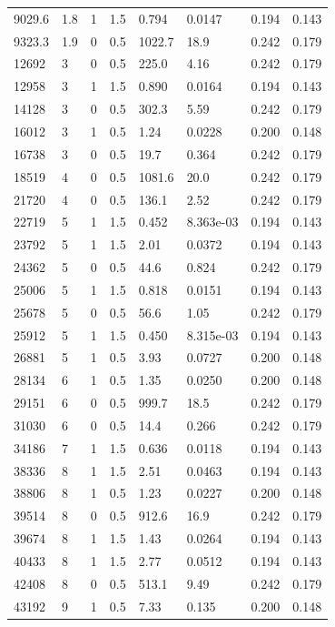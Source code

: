 \documentclass[preview]{standalone}
\begin{document}
{{\begin{tabular}{L{1.2cm}C{1.2cm} C{0.3cm}C{0.5cm} C{1.4cm}C{1.4cm} C{1.4cm}C{1.4cm}}
  9029.6  &   1.8  & 1     & 1.5 &  0.794  & 0.0147  & 0.194 &  0.143   \\ 
  9323.3  &   1.9  & 0     & 0.5 &  1022.7  & 18.9  & 0.242 &  0.179   \\ 
  12692  &     3  & 0     & 0.5 &  225.0  & 4.16  & 0.242 &  0.179   \\ 
  12958  &     3  & 1     & 1.5 &  0.890  & 0.0164  & 0.194 &  0.143   \\ 
  14128  &     3  & 0     & 0.5 &  302.3  & 5.59  & 0.242 &  0.179   \\ 
  16012  &     3  & 1     & 0.5 &  1.24  & 0.0228  & 0.200 &  0.148   \\ 
  16738  &     3  & 0     & 0.5 &  19.7  & 0.364  & 0.242 &  0.179   \\ 
  18519  &     4  & 0     & 0.5 &  1081.6  & 20.0  & 0.242 &  0.179   \\ 
  21720  &     4  & 0     & 0.5 &  136.1  & 2.52  & 0.242 &  0.179   \\ 
  22719  &     5  & 1     & 1.5 &  0.452  & 8.363e-03  & 0.194 &  0.143   \\ 
  23792  &     5  & 1     & 1.5 &  2.01  & 0.0372  & 0.194 &  0.143   \\ 
  24362  &     5  & 0     & 0.5 &  44.6  & 0.824  & 0.242 &  0.179   \\ 
  25006  &     5  & 1     & 1.5 &  0.818  & 0.0151  & 0.194 &  0.143   \\ 
  25678  &     5  & 0     & 0.5 &  56.6  & 1.05  & 0.242 &  0.179   \\ 
  25912  &     5  & 1     & 1.5 &  0.450  & 8.315e-03  & 0.194 &  0.143   \\ 
  26881  &     5  & 1     & 0.5 &  3.93  & 0.0727  & 0.200 &  0.148   \\ 
  28134  &     6  & 1     & 0.5 &  1.35  & 0.0250  & 0.200 &  0.148   \\ 
  29151  &     6  & 0     & 0.5 &  999.7  & 18.5  & 0.242 &  0.179   \\ 
  31030  &     6  & 0     & 0.5 &  14.4  & 0.266  & 0.242 &  0.179   \\ 
  34186  &     7  & 1     & 1.5 &  0.636  & 0.0118  & 0.194 &  0.143   \\ 
  38336  &     8  & 1     & 1.5 &  2.51  & 0.0463  & 0.194 &  0.143   \\ 
  38806  &     8  & 1     & 0.5 &  1.23  & 0.0227  & 0.200 &  0.148   \\ 
  39514  &     8  & 0     & 0.5 &  912.6  & 16.9  & 0.242 &  0.179   \\ 
  39674  &     8  & 1     & 1.5 &  1.43  & 0.0264  & 0.194 &  0.143   \\ 
  40433  &     8  & 1     & 1.5 &  2.77  & 0.0512  & 0.194 &  0.143   \\ 
  42408  &     8  & 0     & 0.5 &  513.1  & 9.49  & 0.242 &  0.179   \\ 
  43192  &     9  & 1     & 0.5 &  7.33  & 0.135  & 0.200 &  0.148   \\ 
\hline 
\end{tabular} 

}}
\end{document}
